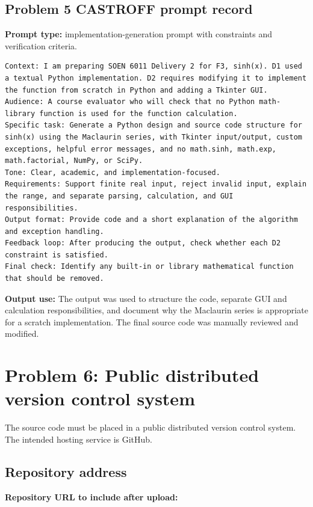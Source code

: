 \documentclass[11pt]{article}
\begin{document}
\subsection{Problem 5 CASTROFF prompt record}

\textbf{Prompt type:} implementation-generation prompt with constraints and verification criteria.

\begin{lstlisting}[style=textstyle]
Context: I am preparing SOEN 6011 Delivery 2 for F3, sinh(x). D1 used a textual Python implementation. D2 requires modifying it to implement the function from scratch in Python and adding a Tkinter GUI.
Audience: A course evaluator who will check that no Python math-library function is used for the function calculation.
Specific task: Generate a Python design and source code structure for sinh(x) using the Maclaurin series, with Tkinter input/output, custom exceptions, helpful error messages, and no math.sinh, math.exp, math.factorial, NumPy, or SciPy.
Tone: Clear, academic, and implementation-focused.
Requirements: Support finite real input, reject invalid input, explain the range, and separate parsing, calculation, and GUI responsibilities.
Output format: Provide code and a short explanation of the algorithm and exception handling.
Feedback loop: After producing the output, check whether each D2 constraint is satisfied.
Final check: Identify any built-in or library mathematical function that should be removed.
\end{lstlisting}

\textbf{Output use:} The output was used to structure the code, separate GUI and calculation responsibilities, and document why the Maclaurin series is appropriate for a scratch implementation. The final source code was manually reviewed and modified.

\section{Problem 6: Public distributed version control system}

The source code must be placed in a public distributed version control system. The intended hosting service is GitHub.

\subsection{Repository address}

\textbf{Repository URL to include after upload:}
\end{document}
